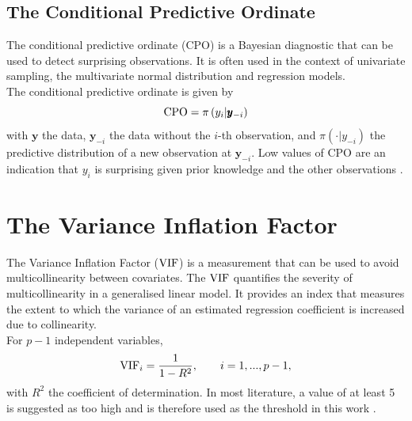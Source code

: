 \subsection{The Conditional Predictive Ordinate}
The conditional predictive ordinate (CPO) is a Bayesian diagnostic that can be used to detect surprising observations. It is often used in the context of univariate sampling, the multivariate normal distribution and regression models. \\
The conditional predictive ordinate is given by
\begin{equation}
    \hbox{CPO} = \pi\left(y_i|\pmb{y}_{-i}\right)
\end{equation}
with $\pmb{y}$ the data, $\pmb{y}_{-i}$ the data without the $i$-th observation, and $\pi\left(\cdot|y_{-i}\right)$ the predictive distribution of a new observation at $\pmb{y}_{-i}$. Low values of CPO are an indication that $y_i$ is surprising given prior knowledge and the other observations \autocite[][]{pettit1990conditional, cox1980discussion}.
\clearpage
\section{The Variance Inflation Factor}\label{sec:vif}
The Variance Inflation Factor ($\hbox{VIF}$) is a measurement that can be used to avoid multicollinearity between covariates. The $\hbox{VIF}$ quantifies the severity of multicollinearity in a generalised linear model. It provides an index that measures the extent to which the variance of an estimated regression coefficient is increased due to collinearity. \\
For $p-1$ independent variables, 
\begin{equation}
    \hbox{VIF}_i = \frac{1}{1-R^2},\hspace{20pt}i=1,...,p-1,
\end{equation}
with $R^2$ the coefficient of determination. In most literature, a value of at least 5 is suggested as too high and is therefore used as the threshold in this work \autocite[][]{craney2002model}.
\clearpage
